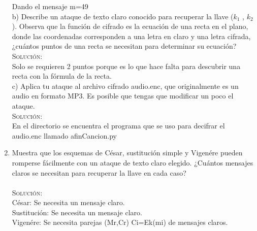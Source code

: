\documentclass[letterpaper,10pt]{article}
\begin{document}
\begin{enumerate}
Dando el mensaje m=49\\
	
	b) Describe un ataque de texto claro conocido para recuperar la llave
($k_{1}$ , $k_{2}$ ). Observa que la función de cifrado es la ecuación de una recta en
el plano, donde las coordenadas corresponden a una letra en claro y una
letra cifrada, ¿cuántos puntos de una recta se necesitan para determinar
su ecuación?\\  
    \textsc{Solución:}
	\\
	Solo se requieren 2 puntos porque es lo que hace falta para descubrir una recta con la fórmula de la recta.\\
	
	c) Aplica tu ataque al archivo cifrado audio.enc, que originalmente es un
audio en formato MP3. Es posible que tengas que modificar un poco el
ataque.\\    
	\textsc{Solución:}
	\\ 
	En el directorio se encuentra el programa que se uso para decifrar el audio.enc llamado afinCancion.py
	
   	    
    \item Muestra que los esquemas de César, sustitución simple y Vigenére pueden
romperse fácilmente con un ataque de texto claro elegido. ¿Cuántos mensajes
claros se necesitan para recuperar la llave en cada caso?
     \\ \\
    \textsc{Solución:}
	\\    
	César:		Se necesita un mensaje claro.\\
Sustitución:	Se necesita un mensaje claro.\\
Vigenére:	Se necesita parejas (Mr,Cr) Ci=Ek(mi) de mensajes claros.\\
 \end{enumerate}
\end{document}
